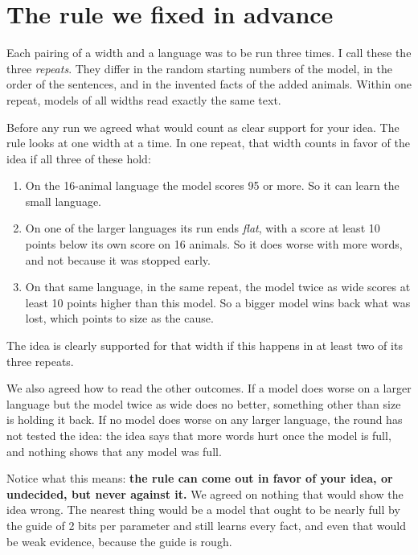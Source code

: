 \section{The rule we fixed in advance}\label{sec:rule}

Each pairing of a width and a language was to be run three times. I call these the three
\emph{repeats}. They differ in the random starting numbers of the model, in the order of the
sentences, and in the invented facts of the added animals. Within one repeat, models of all
widths read exactly the same text.

Before any run we agreed what would count as clear support for your idea. The rule looks at
one width at a time. In one repeat, that width counts in favor of the idea if all three of
these hold:
\begin{enumerate}[label=(\alph*),leftmargin=2.2em]
\item On the 16-animal language the model scores 95 or more. So it can learn the small language.
\item On one of the larger languages its run ends \emph{flat}, with a score at least 10 points
      below its own score on 16 animals. So it does worse with more words, and not because
      it was stopped early.
\item On that same language, in the same repeat, the model twice as wide scores at least 10
      points higher than this model. So a bigger model wins back what was lost, which points
      to size as the cause.
\end{enumerate}
The idea is clearly supported for that width if this happens in at least two of its three
repeats.

We also agreed how to read the other outcomes. If a model does worse on a larger language but
the model twice as wide does no better, something other than size is holding it back. If no
model does worse on any larger language, the round has not tested the idea: the idea says that
more words hurt once the model is full, and nothing shows that any model was full.

Notice what this means: \textbf{the rule can come out in favor of your idea, or undecided,
but never against it.} We agreed on nothing that would show the idea wrong. The nearest thing
would be a model that ought to be nearly full by the guide of 2 bits per parameter and still
learns every fact, and even that would be weak evidence, because the guide is rough.
